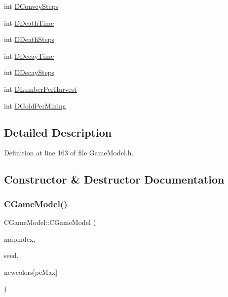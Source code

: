 \begin{DoxyCompactItemize}
int \hyperlink{classCGameModel_ad322487a9b50d395fe69c7ad95b71a10}{D\+Convey\+Steps}
\item 
int \hyperlink{classCGameModel_a2ddf991af7749f946a4fe242b2397b9a}{D\+Death\+Time}
\item 
int \hyperlink{classCGameModel_a8067a8f3737b0f1d6fced523926ce167}{D\+Death\+Steps}
\item 
int \hyperlink{classCGameModel_abd062550cd4f0f9286f78f3195fe2f71}{D\+Decay\+Time}
\item 
int \hyperlink{classCGameModel_ac4a0ea3659c796b1c4f8b1f91d0e3258}{D\+Decay\+Steps}
\item 
int \hyperlink{classCGameModel_abfa4628f678b64ecfefb9f56150d906f}{D\+Lumber\+Per\+Harvest}
\item 
int \hyperlink{classCGameModel_a886529fe17365373d28c2881fdaa21f0}{D\+Gold\+Per\+Mining}
\end{DoxyCompactItemize}


\subsection{Detailed Description}


Definition at line 163 of file Game\+Model.\+h.



\subsection{Constructor \& Destructor Documentation}
\hypertarget{classCGameModel_a37858821d1294b21b374cf4f81052f3e}{}\label{classCGameModel_a37858821d1294b21b374cf4f81052f3e} 
\subsubsection{\texorpdfstring{C\+Game\+Model()}{CGameModel()}}
{\footnotesize\ttfamily C\+Game\+Model\+::\+C\+Game\+Model (\begin{DoxyParamCaption}\item[{int}]{mapindex,  }\item[{uint64\+\_\+t}]{seed,  }\item[{\hyperlink{GameDataTypes_8h_aafb0ca75933357ff28a6d7efbdd7602f}{E\+Player\+Color}}]{newcolors\mbox{[}pc\+Max\mbox{]} }\end{DoxyParamCaption})}



